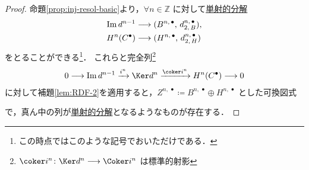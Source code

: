 \documentclass[algtopo_main]{subfiles}
\begin{document}
\begin{proof}
    命題\ref{prop:inj-resol-basic}より，$\forall n \in \mathbb{Z}$ に対して\hyperref[def:injective-resolution]{単射的分解}
    \begin{align}
        \Im d^{n-1} &\longrightarrow (B^{n,\, \bullet},\, d_{2,\, B}^{n,\,\bullet}),\label{eq:CE-resol-1R}\\
        H^n(C^\bullet) &\longrightarrow (H^{n,\, \bullet},\, d_{2,\, H}^{n,\,\bullet})\label{eq:CE-resol-2R}
    \end{align}
    をとることができる\footnote{この時点ではこのような記号でおいただけである．}．
    これらと完全列\footnote{$\coker i^{n} \colon \Ker d^n \lto \Coker i^n$ は標準的射影}
    \begin{align}
        0 \lto \Im d^{n-1} \xrightarrow{i^{n}} \Ker d^{n} \xrightarrow{\coker i^{n}} H^{n}(C^\bullet) \lto 0
    \end{align}
    に対して補題\ref{lem:RDF-2}を適用すると，$Z^{n,\, \bullet} \coloneqq B^{n,\, \bullet} \oplus H^{n,\, \bullet}$ とした可換図式
    \begin{center}
    \end{center}
    で，真ん中の列が\hyperref[def:injective-resolution]{単射的分解}となるようなものが存在する．


\end{proof}
\end{document}
